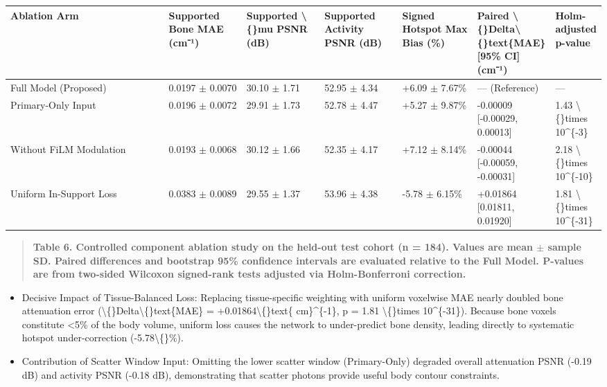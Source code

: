 \documentclass[11pt]{article}
\begin{document}
\begingroup\small\setlength{\tabcolsep}{3pt}\begin{longtable}{p{0.32\linewidth}p{0.14\linewidth}p{0.14\linewidth}p{0.14\linewidth}p{0.14\linewidth}p{0.14\linewidth}p{0.14\linewidth}}
\toprule
Ablation Arm & Supported Bone MAE (cm⁻¹) & Supported \textbackslash\{\}mu PSNR (dB) & Supported Activity PSNR (dB) & Signed Hotspot Max Bias (\%) & Paired \textbackslash\{\}Delta\textbackslash\{\}text\{MAE\} [95\% CI] (cm⁻¹) & Holm-adjusted p-value \\
\midrule
Full Model (Proposed) & 0.0197 $\pm$ 0.0070 & 30.10 $\pm$ 1.71 & 52.95 $\pm$ 4.34 & +6.09 $\pm$ 7.67\% & — (Reference) & — \\
Primary-Only Input & 0.0196 $\pm$ 0.0072 & 29.91 $\pm$ 1.73 & 52.78 $\pm$ 4.47 & +5.27 $\pm$ 9.87\% & -0.00009 [-0.00029, 0.00013] & 1.43 \textbackslash\{\}times 10\textasciicircum{}\{-3\} \\
Without FiLM Modulation & 0.0193 $\pm$ 0.0068 & 30.12 $\pm$ 1.66 & 52.35 $\pm$ 4.17 & +7.12 $\pm$ 8.14\% & -0.00044 [-0.00059, -0.00031] & 2.18 \textbackslash\{\}times 10\textasciicircum{}\{-10\} \\
Uniform In-Support Loss & 0.0383 $\pm$ 0.0089 & 29.55 $\pm$ 1.37 & 53.96 $\pm$ 4.38 & -5.78 $\pm$ 6.15\% & +0.01864 [0.01811, 0.01920] & 1.81 \textbackslash\{\}times 10\textasciicircum{}\{-31\} \\
\bottomrule
\end{longtable}\endgroup
\begin{quote}\small\textbf{Table 6. Controlled component ablation study on the held-out test cohort (n = 184). Values are mean $\pm$ sample SD. Paired differences and bootstrap 95\% confidence intervals are evaluated relative to the Full Model. P-values are from two-sided Wilcoxon signed-rank tests adjusted via Holm-Bonferroni correction.}\end{quote}
\begin{itemize}\item Decisive Impact of Tissue-Balanced Loss: Replacing tissue-specific weighting with uniform voxelwise MAE nearly doubled bone attenuation error (\textbackslash\{\}Delta\textbackslash\{\}text\{MAE\} = +0.01864\textbackslash\{\}text\{ cm\}\textasciicircum{}\{-1\}, p = 1.81 \textbackslash\{\}times 10\textasciicircum{}\{-31\}). Because bone voxels constitute <5\% of the body volume, uniform loss causes the network to under-predict bone density, leading directly to systematic hotspot under-correction (-5.78\textbackslash\{\}\%).\end{itemize}
\begin{itemize}\item Contribution of Scatter Window Input: Omitting the lower scatter window (Primary-Only) degraded overall attenuation PSNR (-0.19 dB) and activity PSNR (-0.18 dB), demonstrating that scatter photons provide useful body contour constraints.\end{itemize}
\end{document}

